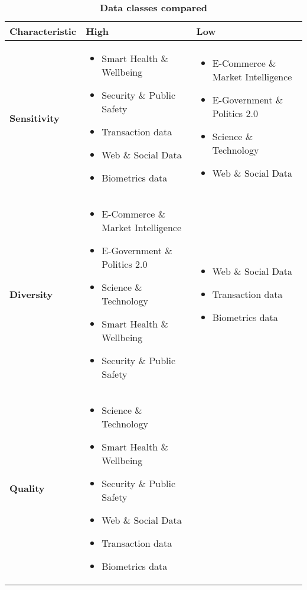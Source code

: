 \begin{table}[H]
\footnotesize
\centering
\caption{\textbf{Data classes compared}}
\label{tab:data_class_compare}

\begin{tabular}{ | p{2.2cm} | p{5.8cm} | p{5.8cm} | }

\hline

\textbf{Characteristic} & \textbf{High} & \textbf{Low} \\ \hline

\textbf{Sensitivity}         &
\begin{itemize}[leftmargin=*]
  \item Smart Health \& Wellbeing
  \item Security \& Public Safety
  \item Transaction data
  \item Web \& Social Data
  \item Biometrics data
\end{itemize}
&
\begin{itemize}[leftmargin=*]
  \item E-Commerce \& Market Intelligence
  \item E-Government \& Politics 2.0
  \item Science \& Technology
  \item Web \& Social Data
\end{itemize}
\\ \hline

\textbf{Diversity}           &
\begin{itemize}[leftmargin=*]
  \item E-Commerce \& Market Intelligence
  \item E-Government \& Politics 2.0
  \item Science \& Technology
  \item Smart Health \& Wellbeing
  \item Security \& Public Safety
\end{itemize}
&
\begin{itemize}[leftmargin=*]
  \item Web \& Social Data
  \item Transaction data
  \item Biometrics data
\end{itemize}
\\ \hline

\textbf{Quality}             &
\begin{itemize}[leftmargin=*]
  \item Science \& Technology
  \item Smart Health \& Wellbeing
  \item Security \& Public Safety
  \item Web \& Social Data
  \item Transaction data
  \item Biometrics data
\end{itemize}
&
\\ \hline


\end{tabular}
\end{table}
